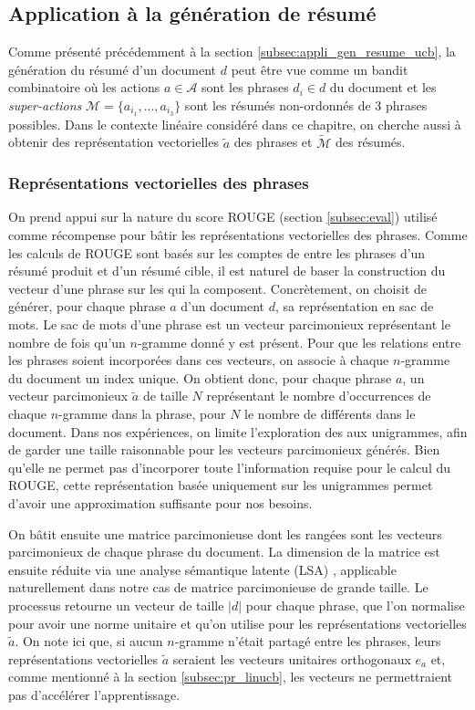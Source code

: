 \subsection{Application à la génération de résumé}
\label{subsec:representations_phrases}

Comme présenté précédemment à la section \ref{subsec:appli_gen_resume_ucb}, 
la génération du résumé d'un document $d$ peut être vue comme un bandit combinatoire 
où les actions $a \in \mathcal{A}$ sont les phrases $d_i \in d$ du document
et les \textit{super-actions} $\mathcal{M}=\{a_{i_1},...,a_{i_3}\}$ sont 
les résumés non-ordonnés de 3 phrases possibles.
Dans le contexte linéaire considéré dans ce chapitre, on cherche aussi 
à obtenir des représentation vectorielles $\tilde{a}$ des phrases 
et $\tilde{\mathcal{M}}$ des résumés.


\subsubsection*{Représentations vectorielles des phrases}

On prend appui sur la nature du score ROUGE (section \ref{subsec:eval}) 
utilisé comme récompense pour bâtir les représentations vectorielles des phrases.
Comme les calculs de ROUGE sont basés sur les comptes 
de \ngrams entre les phrases d'un résumé produit et d'un résumé
cible, il est naturel de baser la construction du vecteur 
d'une phrase sur les \ngrams qui la composent.
Concrètement, on choisit de générer, pour chaque phrase $a$ d'un document $d$,
sa représentation en sac de mots. 
Le sac de mots d'une phrase est un vecteur parcimonieux représentant 
le nombre de fois qu'un $n$-gramme donné y est présent.
Pour que les relations entre les phrases soient incorporées dans ces vecteurs,
on associe à chaque $n$-gramme du document un index unique.
On obtient donc, pour chaque phrase $a$, un vecteur parcimonieux $\tilde{a}$
de taille $N$ représentant le 
nombre d'occurrences de chaque $n$-gramme dans la phrase, pour $N$  le nombre de \ngrams 
différents dans le document.
Dans nos expériences, on limite l'exploration des \ngrams aux unigrammes,
afin de garder une taille raisonnable pour les vecteurs parcimonieux générés.
Bien qu'elle ne permet pas d'incorporer toute l'information requise pour 
le calcul du ROUGE, cette représentation basée uniquement sur les unigrammes
permet d'avoir une approximation suffisante pour nos besoins.

On bâtit ensuite une matrice parcimonieuse dont les rangées sont les vecteurs parcimonieux 
de chaque phrase du document.
La dimension de la matrice est ensuite réduite via une analyse sémantique latente (LSA) \citep{10.1145/291128.291131}, 
applicable naturellement dans notre cas de matrice parcimonieuse de grande taille.
Le processus retourne un vecteur de taille $|d|$ pour chaque phrase, que l'on normalise pour avoir 
une norme unitaire et qu'on utilise pour les 
représentations vectorielles $\tilde{a}$.
On note ici que, si aucun $n$-gramme n'était partagé entre les phrases,
leurs représentations vectorielles $\tilde{a}$ seraient
les vecteurs unitaires orthogonaux $e_a$ et, 
comme mentionné à la section \ref{subsec:pr_linucb}, les vecteurs
ne permettraient pas d'accélérer l'apprentissage.

